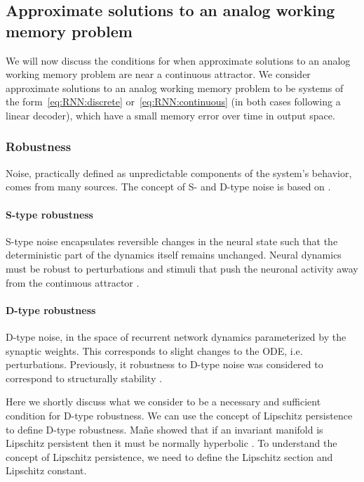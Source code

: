 \documentclass{article} %
\newcounter{ct}
\theoremstyle{definition}
\theoremstyle{remark}
\begin{document}
\subsection{Approximate solutions  to an analog working memory problem}\label{sec:condition_clarifications}
We will now discuss the conditions for when approximate solutions to an analog working memory problem are near a continuous attractor.
We consider approximate solutions to an analog working memory problem to be systems of the form~\ref{eq:RNN:discrete} or~\ref{eq:RNN:continuous} (in both cases following a linear decoder), which have a small memory error over time in output space.





\subsubsection{Robustness}
Noise, practically defined as unpredictable components of the system's behavior, comes from many sources.
The concept of S- and D-type noise is based on \citep{Park2023a}.


\paragraph{S-type robustness}\label{sec:stype}
S-type noise encapsulates reversible changes in the neural state such that the deterministic part of the dynamics itself remains unchanged.
Neural dynamics must be robust to perturbations and stimuli that push the neuronal activity away from the continuous attractor \citep{durstewitz2000neurocomputational}.


\paragraph{D-type robustness}\label{sec:persitencempliesnh}
D-type noise, in the space of recurrent network dynamics parameterized by the synaptic weights.
This corresponds to slight changes to the ODE, i.e. perturbations.
Previously, it robustness to D-type noise was considered to correspond to structurally stability \citep{Park2023a}.

Here we shortly discuss what we consider to be a necessary and sufficient condition for D-type robustness.
We can use the concept of Lipschitz persistence to define D-type robustness.
Ma\~{n}e showed that if an invariant manifold is Lipschitz persistent then it must be normally hyperbolic \citep{mane1978persistent}.
To understand the concept of Lipschitz persistence, we need to define the Lipschitz section and Lipschitz constant.
\end{document}
